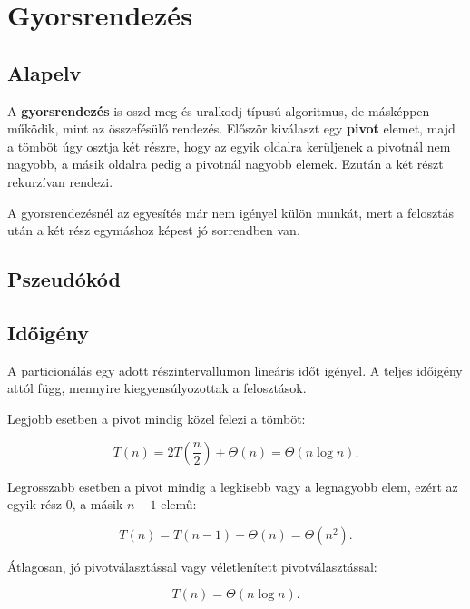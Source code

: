 \section{Gyorsrendezés}

\subsection{Alapelv}

A \textbf{gyorsrendezés} is oszd meg és uralkodj típusú algoritmus, de másképpen működik, mint az összefésülő rendezés. Először kiválaszt egy \textbf{pivot} elemet, majd a tömböt úgy osztja két részre, hogy az egyik oldalra kerüljenek a pivotnál nem nagyobb, a másik oldalra pedig a pivotnál nagyobb elemek. Ezután a két részt rekurzívan rendezi.

A gyorsrendezésnél az egyesítés már nem igényel külön munkát, mert a felosztás után a két rész egymáshoz képest jó sorrendben van.



\subsection{Pszeudókód}



\subsection{Időigény}

A particionálás egy adott részintervallumon lineáris időt igényel. A teljes időigény attól függ, mennyire kiegyensúlyozottak a felosztások.

Legjobb esetben a pivot mindig közel felezi a tömböt:

\[
T(n)=2T\left(\frac{n}{2}\right)+\Theta(n)=\Theta(n\log n).
\]

Legrosszabb esetben a pivot mindig a legkisebb vagy a legnagyobb elem, ezért az egyik rész $0$, a másik $n-1$ elemű:

\[
T(n)=T(n-1)+\Theta(n)=\Theta(n^2).
\]

Átlagosan, jó pivotválasztással vagy véletlenített pivotválasztással:

\[
T(n)=\Theta(n\log n).
\]

